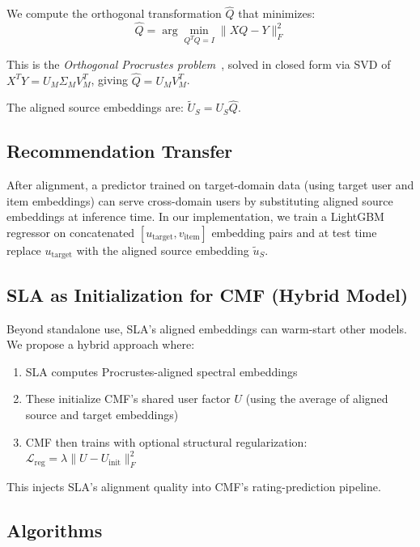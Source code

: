 \documentclass[conference]{IEEEtran}
\begin{document}
We compute the orthogonal transformation $\hat{Q}$ that minimizes:
\begin{equation}
    \hat{Q} = \arg\min_{Q^TQ=I} \| X Q - Y \|_F^2
\end{equation}

This is the \emph{Orthogonal Procrustes problem}~\cite{schoenemann1966}, solved in closed form via SVD of $X^T Y = U_M \Sigma_M V_M^T$, giving $\hat{Q} = U_M V_M^T$.

The aligned source embeddings are: $\tilde{U}_S = U_S \hat{Q}$.

\subsection{Recommendation Transfer}

After alignment, a predictor trained on target-domain data (using target user and item embeddings) can serve cross-domain users by substituting aligned source embeddings at inference time. In our implementation, we train a LightGBM regressor on concatenated $[u_{\text{target}}, v_{\text{item}}]$ embedding pairs and at test time replace $u_{\text{target}}$ with the aligned source embedding $\tilde{u}_S$.

\subsection{SLA as Initialization for CMF (Hybrid Model)}

Beyond standalone use, SLA's aligned embeddings can warm-start other models. We propose a hybrid approach where:
\begin{enumerate}
    \item SLA computes Procrustes-aligned spectral embeddings
    \item These initialize CMF's shared user factor $U$ (using the average of aligned source and target embeddings)
    \item CMF then trains with optional structural regularization: $\mathcal{L}_{\text{reg}} = \lambda \| U - U_{\text{init}} \|_F^2$
\end{enumerate}

This injects SLA's alignment quality into CMF's rating-prediction pipeline.

\subsection{Algorithms}
\end{document}
